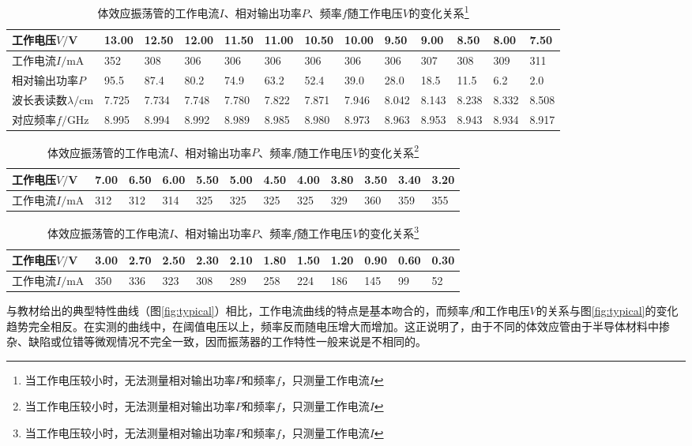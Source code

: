 \documentclass[aps,pre,12pt,preprint,onecolumn,showpacs,showkeys]{revtex4-1}
\begin{document}
    \begin{table}[h]
        \caption{\label{tab:feature_curve}%
        体效应振荡管的工作电流$I$、相对输出功率$P$、频率$f$随工作电压$V$的变化关系\footnote{当工作电压较小时，无法测量相对输出功率$P$和频率$f$，只测量工作电流$I$}}
        \begin{tabular}{|l|l|l|l|l|l|l|l|l|l|l|l|l|}
            \hline
            工作电压$V/$V&13.00&12.50&12.00&11.50&11.00&10.50&10.00&9.50&9.00&8.50&8.00&7.50\\\hline
            工作电流$I/$mA&352&308&306&306&306&306&306&306&307&308&309&311\\\hline
            相对输出功率$P$&95.5&87.4&80.2&74.9&63.2&52.4&39.0&28.0&18.5&11.5&6.2&2.0\\\hline
            波长表读数$\lambda/$cm&7.725&7.734&7.748&7.780&7.822&7.871&7.946&8.042&8.143&8.238&8.332&8.508\\\hline
            对应频率$f/$GHz&8.995&8.994&8.992&8.989&8.985&8.980&8.973&8.963&8.953&8.943&8.934&8.917\\\hline
        \end{tabular}
        \begin{tabular}{|l|l|l|l|l|l|l|l|l|l|l|l|}
            \hline
            工作电压$V/$V&7.00&6.50&6.00&5.50&5.00&4.50&4.00&3.80&3.50&3.40&3.20\\\hline
            工作电流$I/$mA&312&312&314&325&325&325&325&329&360&359&355\\\hline
        \end{tabular}
        \begin{tabular}{|l|l|l|l|l|l|l|l|l|l|l|l|}
            \hline
            工作电压$V/$V&3.00&2.70&2.50&2.30&2.10&1.80&1.50&1.20&0.90&0.60&0.30\\\hline
            工作电流$I/$mA&350&336&323&308&289&258&224&186&145&99&52\\\hline
        \end{tabular}
    \end{table}

    与教材给出的典型特性曲线（图\ref{fig:typical}）相比，工作电流曲线的特点是基本吻合的，而频率$f$和工作电压$V$的关系与图\ref{fig:typical}的变化趋势完全相反。在实测的曲线中，在阈值电压以上，频率反而随电压增大而增加。这正说明了，由于不同的体效应管由于半导体材料中掺杂、缺陷或位错等微观情况不完全一致，因而振荡器的工作特性一般来说是不相同的。
\end{document}
